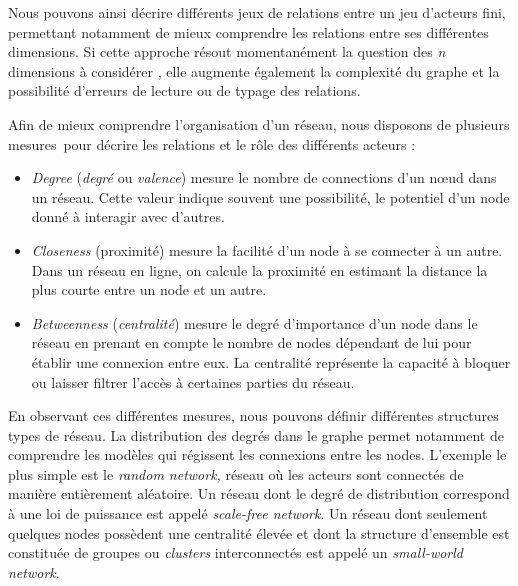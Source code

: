 Nous pouvons ainsi décrire différents jeux de relations entre un jeu d{\textquoteright}acteurs fini, permettant notamment de mieux comprendre les relations entre ses différentes dimensions. Si cette approche résout momentanément la question des \textit{n} dimensions à considérer \citep{Brodka2013}, elle augmente également la complexité du graphe et la possibilité d{\textquoteright}erreurs de lecture ou de typage des relations.

Afin de mieux comprendre l{\textquoteright}organisation d{\textquoteright}un réseau, nous disposons de plusieurs mesures~pour décrire les relations et le r\^ole des différents acteurs :

\begin{itemize}
    \item \textit{Degree} (\textit{degré} ou \textit{valence}) mesure le nombre de connections d{\textquoteright}un n{\oe}ud dans un réseau. Cette valeur indique souvent une possibilité, le potentiel d{\textquoteright}un node donné à interagir avec d{\textquoteright}autres.  
    \item \textit{Closeness} (proximité) mesure la facilité d{\textquoteright}un node à se connecter à un autre. Dans un réseau en ligne, on calcule la proximité en estimant la distance la plus courte entre un node et un autre. 
    \item \textit{Betweenness} (\textit{centralité}) mesure le degré d{\textquoteright}importance d{\textquoteright}un node dans le réseau en prenant en compte le nombre de nodes dépendant de lui pour établir une connexion entre eux. La centralité représente la capacité à bloquer ou laisser filtrer l{\textquoteright}accès à certaines parties du réseau.
\end{itemize}

En observant ces différentes mesures, nous pouvons définir différentes structures types de réseau. La distribution des degrés dans le graphe permet notamment de comprendre les modèles qui régissent les connexions entre les nodes. L{\textquoteright}exemple le plus simple est le \textit{random network, }réseau o\`u les acteurs sont connectés de manière entièrement aléatoire. Un réseau dont le degré de distribution correspond à une loi de puissance est appelé \textit{scale-free network}. Un réseau dont seulement quelques nodes possèdent une centralité élevée et dont la structure d{\textquoteright}ensemble est constituée de groupes ou \textit{clusters} interconnectés est appelé un \textit{small-world network}.

